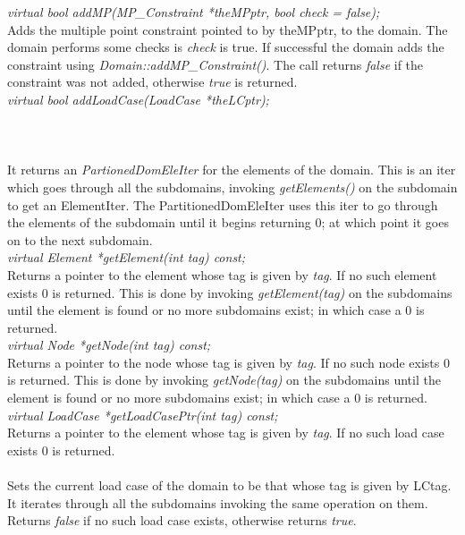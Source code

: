 {\em virtual bool addMP(MP\_Constraint *theMPptr, bool check = false);}  \\
Adds the multiple point constraint pointed to by theMPptr, to the
domain. The domain performs some checks is {\em check} is true. If
successful the domain adds the constraint using {\em
Domain::addMP\_Constraint()}. The call returns {\em false} if
the constraint was not added, otherwise {\em true} is returned. \\  


{\em virtual bool addLoadCase(LoadCase *theLCptr);}  \\
\\

  \\
 \\
It returns an {\em PartionedDomEleIter} for the elements of the domain. This
is an iter which goes through all the subdomains, invoking {\em
getElements()} on the subdomain to get an ElementIter. The
PartitionedDomEleIter uses this iter to go through the elements of the
subdomain until it begins returning $0$; at which point it goes on to
the next subdomain. \\

{\em virtual  Element *getElement(int tag) const;}\\
Returns a pointer to the element whose tag is given by {\em tag}. If
no such element exists $0$ is returned. This is done by invoking {\em
getElement(tag)} on the subdomains until the element is found or no
more subdomains exist; in which case a $0$ is returned. \\

{\em virtual  Node *getNode(int tag) const;}\\
Returns a pointer to the node whose tag is given by {\em tag}. If
no such node exists $0$ is returned. This is done by invoking {\em
getNode(tag)} on the subdomains until the element is found or no
more subdomains exist; in which case a $0$ is returned. \\

{\em virtual  LoadCase *getLoadCasePtr(int tag) const;}\\
Returns a pointer to the element whose tag is given by {\em tag}. If
no such load case exists $0$ is returned. \\

 \\
Sets the current load case of the domain to be that whose tag is given
by LCtag. It iterates through all the subdomains invoking the same
operation on them. Returns {\em false} if no such load case exists, otherwise
returns {\em true}. \\

